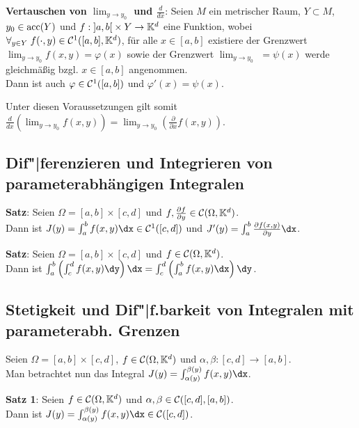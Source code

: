 \textbf{Vertauschen von $\lim_{y \to y_0}$ und $\frac{d}{dx}$}:
Seien $M$ ein metrischer Raum, $Y \subset M$, $y_0 \in \operatorname{acc}(Y)$ und
$f: \left]a,b\right[ \times Y \rightarrow \mathbb{K}^d$ eine Funktion, wobei
$\forall_{y \in Y}\; f(\cdot, y) \in \mathcal{C}^1([a,b], \mathbb{K}^d)$,
für alle $x \in [a,b]$ existiere der Grenzwert
$\lim_{y \to y_0} f(x,y) = \varphi(x)$ sowie der Grenzwert
$\lim_{y \to y_0}$  $= \psi(x)$
werde gleichmäßig bzgl. $x \in [a,b]$ angenommen. \\
Dann ist auch $\varphi \in \mathcal{C}^1([a,b])$ und $\varphi'(x) = \psi(x)$.

Unter diesen Voraussetzungen gilt somit
$\frac{d}{dx} \left(\lim_{y \to y_0} f(x,y)\right) =
\lim_{y \to y_0} \left(\frac{\partial}{\partial x} f(x,y)\right)$.


\subsection{%
    Dif"|ferenzieren und Integrieren von parameterabhängigen Integralen%
}

\textbf{Satz}:
Seien $\Omega = [a,b] \times [c,d]$
und $f, \frac{\partial f}{\partial y} \in \mathcal{C}(\Omega, \mathbb{K}^d)$. \\
Dann ist $J(y) = \int_a^b f(x,y)\dx \in \C^1([c,d])$
und $J'(y) = \int_a^b \frac{\partial f(x,y)}{\partial y} \dx$.

\textbf{Satz}: Seien $\Omega = [a,b] \times [c,d]$ und
$f \in \mathcal{C}(\Omega, \mathbb{K}^d)$. \\
Dann ist $\int_a^b \left(\int_c^d f(x,y)\dy\right)\dx
= \int_c^d \left(\int_a^b f(x,y)\dx\right)\dy$.

\subsection{%
    Stetigkeit und Dif"|f.barkeit von Integralen mit parameterabh.
    Grenzen%
}

Seien $\Omega = [a,b] \times [c,d]$, $f \in \mathcal{C}(\Omega, \mathbb{K}^d)$
und $\alpha, \beta: [c,d] \rightarrow [a,b]$. \\
Man betrachtet nun das Integral $J(y) = \int_{\alpha(y)}^{\beta(y)} f(x,y)\dx$.

\textbf{Satz 1}: Seien $f \in \mathcal{C}(\Omega, \mathbb{K}^d)$ und
$\alpha, \beta \in \mathcal{C}([c,d], [a,b])$. \\
Dann ist $J(y) = \int_{\alpha(y)}^{\beta(y)} f(x,y)\dx \in \C([c,d])$.


